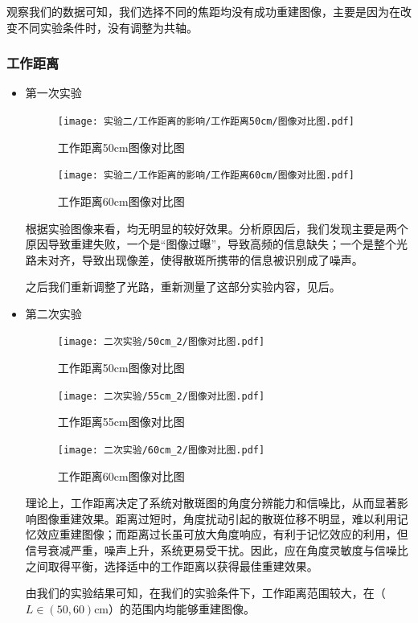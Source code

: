   观察我们的数据可知，我们选择不同的焦距均没有成功重建图像，主要是因为在改变不同实验条件时，没有调整为共轴。







  
\subsubsection{工作距离}

  \begin{itemize}
    \item 第一次实验

      \begin{figure}[H]
          \centering
          \texttt{[image: 实验二/工作距离的影响/工作距离50cm/图像对比图.pdf]}
          \caption{工作距离50cm图像对比图}
      \end{figure}

      \begin{figure}[H]
          \centering
          \texttt{[image: 实验二/工作距离的影响/工作距离60cm/图像对比图.pdf]}
          \caption{工作距离60cm图像对比图}
      \end{figure}
      根据实验图像来看，均无明显的较好效果。分析原因后，我们发现主要是两个原因导致重建失败，一个是“图像过曝”，导致高频的信息缺失；一个是整个光路未对齐，导致出现像差，使得散斑所携带的信息被识别成了噪声。
      
      之后我们重新调整了光路，重新测量了这部分实验内容，见后。

    \item 第二次实验

      \begin{figure}[H]
          \centering
          \texttt{[image: 二次实验/50cm\_2/图像对比图.pdf]}
          \caption{工作距离50cm图像对比图}
      \end{figure}

      \begin{figure}[H]
          \centering
          \texttt{[image: 二次实验/55cm\_2/图像对比图.pdf]}
          \caption{工作距离55cm图像对比图}
      \end{figure}
      \begin{figure}[H]
          \centering
          \texttt{[image: 二次实验/60cm\_2/图像对比图.pdf]}
          \caption{工作距离60cm图像对比图}
      \end{figure}
 
      理论上，工作距离决定了系统对散斑图的角度分辨能力和信噪比，从而显著影响图像重建效果。距离过短时，角度扰动引起的散斑位移不明显，难以利用记忆效应重建图像；而距离过长虽可放大角度响应，有利于记忆效应的利用，但信号衰减严重，噪声上升，系统更易受干扰。因此，应在角度灵敏度与信噪比之间取得平衡，选择适中的工作距离以获得最佳重建效果。

      由我们的实验结果可知，在我们的实验条件下，工作距离范围较大，在（$L \in (50, 60)$cm）的范围内均能够重建图像。




    \end{itemize}
